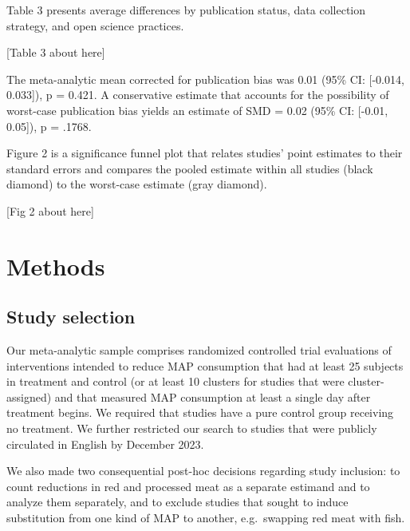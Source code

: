\documentclass[sn-nature,referee,pdflatex]{sn-jnl}
\begin{document}
Table 3 presents average differences by publication status, data
collection strategy, and open science practices.

\begin{center}
[Table 3 about here]
\end{center}

The meta-analytic mean corrected for publication bias \citep{hedges1992}
was 0.01 (95\% CI: {[}-0.014, 0.033{]}), p = 0.421. A conservative
estimate that accounts for the possibility of worst-case publication
bias \citep{mathur2024} yields an estimate of SMD = 0.02 (95\% CI:
{[}-0.01, 0.05{]}), p = .1768.

Figure 2 is a significance funnel plot \citep{mathur2020} that relates
studies' point estimates to their standard errors and compares the
pooled estimate within all studies (black diamond) to the worst-case
estimate (gray diamond).

\begin{center}
[Fig 2 about here]
\end{center}

\section{Methods}\label{sec3}

\subsection{Study selection}\label{sec3.1}

Our meta-analytic sample comprises randomized controlled trial
evaluations of interventions intended to reduce MAP consumption that had
at least 25 subjects in treatment and control (or at least 10 clusters
for studies that were cluster-assigned) and that measured MAP
consumption at least a single day after treatment begins. We required
that studies have a pure control group receiving no treatment. We
further restricted our search to studies that were publicly circulated
in English by December 2023.

We also made two consequential post-hoc decisions regarding study
inclusion: to count reductions in red and processed meat as a separate
estimand and to analyze them separately, and to exclude studies that
sought to induce substitution from one kind of MAP to another,
e.g.~swapping red meat with fish.
\end{document}

